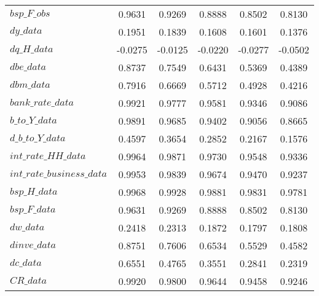 \begin{center}
\begin{longtable}{lccccc}
$bsp\_F\_obs                $	 & 	        0.9631	 & 	        0.9269	 & 	        0.8888	 & 	        0.8502	 & 	        0.8130 \\ 
$dy\_data                   $	 & 	        0.1951	 & 	        0.1839	 & 	        0.1608	 & 	        0.1601	 & 	        0.1376 \\ 
$dq\_H\_data                $	 & 	       -0.0275	 & 	       -0.0125	 & 	       -0.0220	 & 	       -0.0277	 & 	       -0.0502 \\ 
$dbe\_data                  $	 & 	        0.8737	 & 	        0.7549	 & 	        0.6431	 & 	        0.5369	 & 	        0.4389 \\ 
$dbm\_data                  $	 & 	        0.7916	 & 	        0.6669	 & 	        0.5712	 & 	        0.4928	 & 	        0.4216 \\ 
$bank\_rate\_data           $	 & 	        0.9921	 & 	        0.9777	 & 	        0.9581	 & 	        0.9346	 & 	        0.9086 \\ 
$b\_to\_Y\_data             $	 & 	        0.9891	 & 	        0.9685	 & 	        0.9402	 & 	        0.9056	 & 	        0.8665 \\ 
$d\_b\_to\_Y\_data          $	 & 	        0.4597	 & 	        0.3654	 & 	        0.2852	 & 	        0.2167	 & 	        0.1576 \\ 
$int\_rate\_HH\_data        $	 & 	        0.9964	 & 	        0.9871	 & 	        0.9730	 & 	        0.9548	 & 	        0.9336 \\ 
$int\_rate\_business\_data  $	 & 	        0.9953	 & 	        0.9839	 & 	        0.9674	 & 	        0.9470	 & 	        0.9237 \\ 
$bsp\_H\_data               $	 & 	        0.9968	 & 	        0.9928	 & 	        0.9881	 & 	        0.9831	 & 	        0.9781 \\ 
$bsp\_F\_data               $	 & 	        0.9631	 & 	        0.9269	 & 	        0.8888	 & 	        0.8502	 & 	        0.8130 \\ 
$dw\_data                   $	 & 	        0.2418	 & 	        0.2313	 & 	        0.1872	 & 	        0.1797	 & 	        0.1808 \\ 
$dinve\_data                $	 & 	        0.8751	 & 	        0.7606	 & 	        0.6534	 & 	        0.5529	 & 	        0.4582 \\ 
$dc\_data                   $	 & 	        0.6551	 & 	        0.4765	 & 	        0.3551	 & 	        0.2841	 & 	        0.2319 \\ 
$CR\_data                   $	 & 	        0.9920	 & 	        0.9800	 & 	        0.9644	 & 	        0.9458	 & 	        0.9246 \\ 
\end{longtable}
 \end{center}
